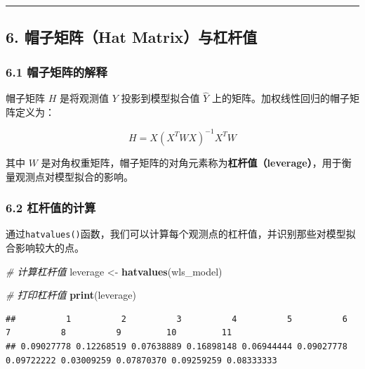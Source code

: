 \documentclass[
  10pt,
]{ctexart}
\newenvironment{Shaded}{\begin{snugshade}}{\end{snugshade}}
\newcommand{\CommentTok}[1]{\textcolor[rgb]{0.56,0.35,0.01}{\textit{#1}}}
\newcommand{\FunctionTok}[1]{\textcolor[rgb]{0.13,0.29,0.53}{\textbf{#1}}}
\newcommand{\NormalTok}[1]{#1}
\newcommand{\OtherTok}[1]{\textcolor[rgb]{0.56,0.35,0.01}{#1}}
\begin{document}
\begin{center}\rule{0.5\linewidth}{0.5pt}\end{center}

\hypertarget{ux5e3dux5b50ux77e9ux9635hat-matrixux4e0eux6760ux6746ux503c}{%
\subsection{6. 帽子矩阵（Hat
Matrix）与杠杆值}\label{ux5e3dux5b50ux77e9ux9635hat-matrixux4e0eux6760ux6746ux503c}}

\hypertarget{ux5e3dux5b50ux77e9ux9635ux7684ux89e3ux91ca}{%
\subsubsection{6.1
帽子矩阵的解释}\label{ux5e3dux5b50ux77e9ux9635ux7684ux89e3ux91ca}}

帽子矩阵 \(H\) 是将观测值 \(Y\) 投影到模型拟合值 \(\hat{Y}\)
上的矩阵。加权线性回归的帽子矩阵定义为：

\[
H = X (X^T W X)^{-1} X^T W
\]

其中 \(W\)
是对角权重矩阵，帽子矩阵的对角元素称为\textbf{杠杆值（leverage）}，用于衡量观测点对模型拟合的影响。

\hypertarget{ux6760ux6746ux503cux7684ux8ba1ux7b97}{%
\subsubsection{6.2
杠杆值的计算}\label{ux6760ux6746ux503cux7684ux8ba1ux7b97}}

通过\texttt{hatvalues()}函数，我们可以计算每个观测点的杠杆值，并识别那些对模型拟合影响较大的点。

\begin{Shaded}
\begin{Highlighting}[]
\CommentTok{\# 计算杠杆值}
\NormalTok{leverage }\OtherTok{\textless{}{-}} \FunctionTok{hatvalues}\NormalTok{(wls\_model)}

\CommentTok{\# 打印杠杆值}
\FunctionTok{print}\NormalTok{(leverage)}
\end{Highlighting}
\end{Shaded}

\begin{verbatim}
##          1          2          3          4          5          6          7          8          9         10         11 
## 0.09027778 0.12268519 0.07638889 0.16898148 0.06944444 0.09027778 0.09722222 0.03009259 0.07870370 0.09259259 0.08333333
\end{verbatim}
\end{document}
